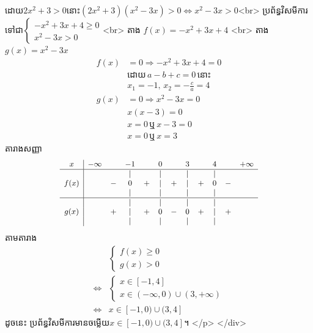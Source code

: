     ដោយ$2x^2+3 \gt 0$នោះ$\left(2x^2+3\right)\left(x^2-3x\right) \gt 0$$\Leftrightarrow x^2-3x\gt 0$<br>
    ប្រព័ន្ធវិសមីការទៅជា$\begin{cases}-x^2+3x+4\ge 0\\ x^2-3x \gt 0 \end{cases}$<br>
    តាង $f(x)=-x^2+3x+4$ <br>
    តាង $g(x)=x^2-3x$
    $$\begin{aligned}
        f(x)&=0\Rightarrow -x^2+3x+4=0\\
        &\text{ដោយ}\,a-b+c=0\,\text{នោះ}\\
        &x_1=-1,\,x_2=-\frac{c}{a}=4\\
        g(x)&=0\Rightarrow x^2-3x=0\\
        &x(x-3)=0\\
        &x=0\,\text{ឬ}\,x-3=0\\
        &x=0\,\text{ឬ}\,x=3
    \end{aligned}$$
    តារាងសញ្ញា
    $$\small\begin{array}{c|lcccccccccr}
     x & -\infty & & -1 & & 0 & & 3 & & 4 & & +\infty \\\hline
       & & &\smash{\large\mid}& & \smash{\large\mid} & & \smash{\large\mid} & & \smash{\large\mid} & & \\
     f(x)& & - & 0 & + & \smash{\large\mid} & + &\smash{\large\mid}& + &0& - & \\
       & & &\smash{\large\mid}& & \smash{\large\mid} & & \smash{\large\mid} & & \smash{\large\mid} & & \\\hline
       & & &\smash{\large\mid}& & \smash{\large\mid} & & \smash{\large\mid} & & \smash{\large\mid} & & \\
    g(x)& & + &\smash{\large\mid}& + & 0 & - &0&+&\smash{\large\mid}& + & \\
         & & &\smash{\large\mid}& & \smash{\large\mid} & & \smash{\large\mid} & & \smash{\large\mid} & & \\
    \end{array}$$
    តាមតារាង
    $$\begin{aligned}
        &\begin{cases}f(x)\ge 0\\ g(x)\gt 0 \end{cases}\\
        \Leftrightarrow& \begin{cases}x\in [-1,4]\\ x\in (-\infty,0)\cup (3,+\infty) \end{cases}\\
        \Leftrightarrow &x\in [-1,0)\cup (3,4]
    \end{aligned}$$
    ដូចនេះ ប្រព័ន្ធវិសមីការមានចម្លើយ$x\in [-1,0)\cup (3,4]$។
    </p>
</div>

